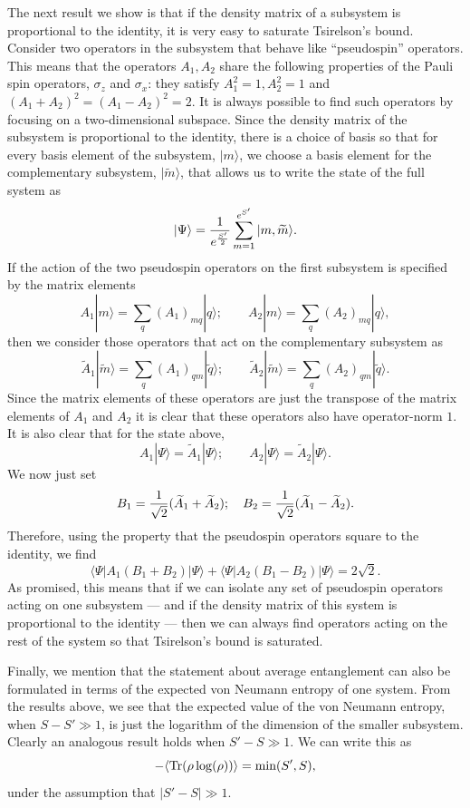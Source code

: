 \documentclass[12pt]{article}
\def\tr{{\rm Tr}}
\newcommand{\be}{\begin{equation}}
\newcommand{\ee}{\end{equation}}
\begin{document}
The next result we show is that if the density matrix of a subsystem is proportional to the identity, it is very easy to saturate Tsirelson's bound.  Consider  two operators in the  subsystem that behave like ``pseudospin'' operators. This means that the operators $A_1, A_2$ share the following properties of the Pauli spin operators, $\sigma_z$ and $\sigma_x$: they satisfy  $A_1^2 = 1, A_2^2 = 1$ and $(A_1 + A_2)^2 = (A_1 - A_2)^2 = 2$.  It is always possible to find such operators by focusing on a two-dimensional subspace. Since the density matrix of the subsystem is proportional to the identity, there is  a choice of basis so that for every basis element of the subsystem, $|m \rangle$, we choose a basis element for the complementary subsystem, $|\widetilde{m} \rangle$, that allows us to write the state of the full system as
\be
|\Psi \rangle = {1 \over e^{S' \over 2}}\sum_{m=1}^{e^{S'}}|m , \widetilde{m} \rangle.
\ee
If the action of the two pseudospin operators on the first subsystem is specified by the matrix elements
\be
A_1 |m \rangle = \sum_q (A_1)_{m q} |q \rangle; \qquad A_2 |m \rangle = \sum_q (A_2)_{m q} |q \rangle,
\ee
then we consider those operators that act on the complementary subsystem as
\be
\widetilde{A}_1 |\widetilde{m} \rangle = \sum_{q} (A_1)_{q m} |\widetilde{q} \rangle; \qquad \widetilde{A}_2 |\widetilde{m} \rangle = \sum_{q} (A_2)_{q m} |\widetilde{q} \rangle.
\ee
Since the matrix elements of these operators are just the transpose of the matrix elements of $A_1$ and $A_2$ it is clear that these operators also have operator-norm $1$.
It is also clear that for the state above,
\be
A_1 | \Psi \rangle = \widetilde{A}_1 |\Psi \rangle; \qquad A_2 | \Psi \rangle = \widetilde{A}_2 |\Psi \rangle.
\ee
We now just set
\be
B_1 = {1 \over \sqrt{2}} (\widetilde{A}_1 + \widetilde{A}_2); \quad B_2 = {1 \over \sqrt{2}} (\widetilde{A}_1 - \widetilde{A}_2).
\ee
Therefore, using the property that the pseudospin operators square to the identity, we find
\be
\langle \Psi| A_1 (B_1 + B_2) |\Psi \rangle + \langle \Psi | A_2 (B_1 - B_2) |\Psi \rangle = 2 \sqrt{2}.
\ee
As promised, this means that if we can isolate any set of pseudospin operators acting on one subsystem --- and if the density matrix of this system is proportional to the identity --- then we can always find operators
acting on the rest of the system so that Tsirelson's bound is saturated.



Finally, we mention that the statement about average entanglement can also be formulated in terms of the expected von Neumann entropy of one system. From the results above, we see that the expected value of the von Neumann entropy, when $S - S' \gg 1$, is just the logarithm of the dimension of the smaller subsystem.  Clearly an analogous result holds when $S' - S \gg 1$.  We can write this as
\be
-\langle \tr(\rho \log (\rho)) \rangle = \text{min}(S', S),
\ee
under the assumption that $|S' - S| \gg 1$.
\end{document}
